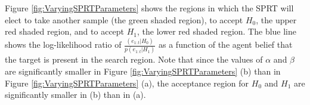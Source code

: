 Figure \ref{fig:VaryingSPRTParameters} shows the regions in which the SPRT will elect to take another sample (the green shaded region), to accept $H_0$, the upper red shaded region, and to accept $H_1$, the lower red shaded region. The blue line shows the log-likelihood ratio of $\frac{(e_{1:t} | H_0)}{p(e_{1:t} | H_1)}$ as a function of the agent belief that the target is present in the search region. 
Note that since the values of $\alpha$ and $\beta$ are significantly smaller in Figure \ref{fig:VaryingSPRTParameters} (b) than in Figure \ref{fig:VaryingSPRTParameters} (a), the acceptance region for $H_0$ and $H_1$ are significantly smaller in (b) than in (a).

\par


